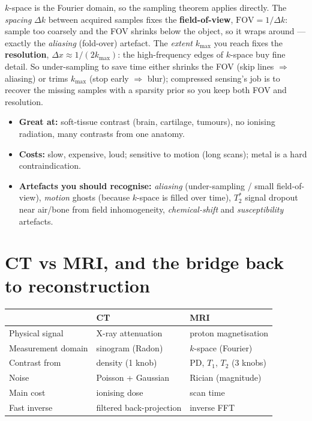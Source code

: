 \documentclass[11pt]{article}
\begin{document}
\begin{notebox}
$k$-space is the Fourier domain, so the sampling theorem applies directly. The
\emph{spacing} $\Delta k$ between acquired samples fixes the
\textbf{field-of-view}, $\mathrm{FOV}=1/\Delta k$: sample too coarsely and the
FOV shrinks below the object, so it wraps around --- exactly the \emph{aliasing}
(fold-over) artefact. The \emph{extent} $k_{\max}$ you reach fixes the
\textbf{resolution}, $\Delta x \approx 1/(2k_{\max})$: the high-frequency edges
of $k$-space buy fine detail. So under-sampling to save time either shrinks the
FOV (skip lines $\Rightarrow$ aliasing) or trims $k_{\max}$ (stop early
$\Rightarrow$ blur); compressed sensing's job is to recover the missing samples
with a sparsity prior so you keep both FOV and resolution.
\end{notebox}

\begin{itemize}[leftmargin=*]
  \item \textbf{Great at:} soft-tissue contrast (brain, cartilage, tumours),
  no ionising radiation, many contrasts from one anatomy.
  \item \textbf{Costs:} slow, expensive, loud; sensitive to motion (long scans);
  metal is a hard contraindication.
  \item \textbf{Artefacts you should recognise:} \emph{aliasing} (under-sampling
  / small field-of-view), \emph{motion} ghosts (because $k$-space is filled over
  time), \emph{$T_2^\ast$} signal dropout near air/bone from field
  inhomogeneity, \emph{chemical-shift} and \emph{susceptibility} artefacts.
\end{itemize}

\section{CT vs MRI, and the bridge back to reconstruction}

\begin{center}
\begin{tabular}{@{}lll@{}}
\toprule
 & CT & MRI \\
\midrule
Physical signal     & X-ray attenuation     & proton magnetisation \\
Measurement domain  & sinogram (Radon)      & $k$-space (Fourier) \\
Contrast from       & density (1 knob)      & PD, $T_1$, $T_2$ (3 knobs) \\
Noise               & Poisson + Gaussian    & Rician (magnitude) \\
Main cost           & ionising dose         & scan time \\
Fast inverse        & filtered back-projection & inverse FFT \\
\bottomrule
\end{tabular}
\end{center}
\end{document}
